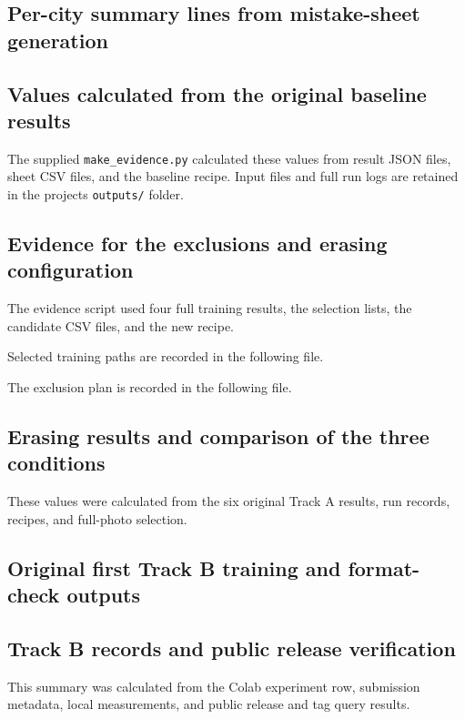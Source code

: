 \documentclass[11pt]{article}
\begin{document}
\subsection*{Per-city summary lines from mistake-sheet generation}

\clearpage
\subsection*{Values calculated from the original baseline results}
The supplied \texttt{make\_evidence.py} calculated these values from result
JSON files, sheet CSV files, and the baseline recipe. Input files and full
run logs are retained in the project\textquotesingle{}s \texttt{outputs/} folder.

\clearpage
\subsection*{Evidence for the exclusions and erasing configuration}
The evidence script used four full training results, the selection lists,
the candidate CSV files, and the new recipe.

Selected training paths are recorded in the following file.
\par{}\par
The exclusion plan is recorded in the following file.
\par{}\par
{}

\clearpage
\subsection*{Erasing results and comparison of the three conditions}
These values were calculated from the six original Track A results, run
records, recipes, and full-photo selection.

\clearpage
\subsection*{Original first Track B training and format-check outputs}

\subsection*{Track B records and public release verification}
This summary was calculated from the Colab experiment row, submission
metadata, local measurements, and public release and tag query results.
\end{document}
